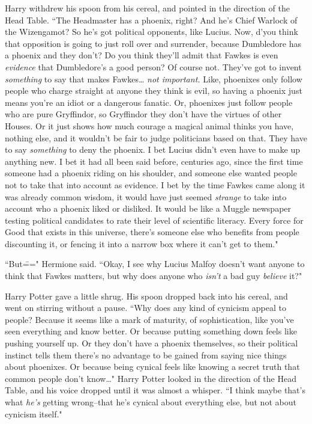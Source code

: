 Harry withdrew his spoon from his cereal, and pointed in the direction of the Head Table. ``The Headmaster has a phoenix, right? And he's Chief Warlock of the Wizengamot? So he's got political opponents, like Lucius. Now, d'you think that opposition is going to just roll over and surrender, because Dumbledore has a phoenix and they don't? Do you think they'll admit that Fawkes is even \emph{evidence} that Dumbledore's a good person? Of course not. They've got to invent \emph{something} to say that makes Fawkes{\ldots} \emph{not important.} Like, phoenixes only follow people who charge straight at anyone they think is evil, so having a phoenix just means you're an idiot or a dangerous fanatic. Or, phoenixes just follow people who are pure Gryffindor, so Gryffindor they don't have the virtues of other Houses. Or it just shows how much courage a magical animal thinks you have, nothing else, and it wouldn't be fair to judge politicians based on that. They have to say \emph{something} to deny the phoenix. I bet Lucius didn't even have to make up anything new. I bet it had all been said before, centuries ago, since the first time someone had a phoenix riding on his shoulder, and someone else wanted people not to take that into account as evidence. I bet by the time Fawkes came along it was already common wisdom, it would have just seemed \emph{strange} to take into account who a phoenix liked or disliked. It would be like a Muggle newspaper testing political candidates to rate their level of scientific literacy. Every force for Good that exists in this universe, there's someone else who benefits from people discounting it, or fencing it into a narrow box where it can't get to them."

``But\===" Hermione said. ``Okay, I see why Lucius Malfoy doesn't want anyone to think that Fawkes matters, but why does anyone who \emph{isn't} a bad guy \emph{believe} it?"

Harry Potter gave a little shrug. His spoon dropped back into his cereal, and went on stirring without a pause. ``Why does any kind of cynicism appeal to people? Because it seems like a mark of maturity, of sophistication, like you've seen everything and know better. Or because putting something down feels like pushing yourself up. Or they don't have a phoenix themselves, so their political instinct tells them there's no advantage to be gained from saying nice things about phoenixes. Or because being cynical feels like knowing a secret truth that common people don't know{\ldots}" Harry Potter looked in the direction of the Head Table, and his voice dropped until it was almost a whisper. ``I think maybe that's what \emph{he's} getting wrong\---that he's cynical about everything else, but not about cynicism itself."

